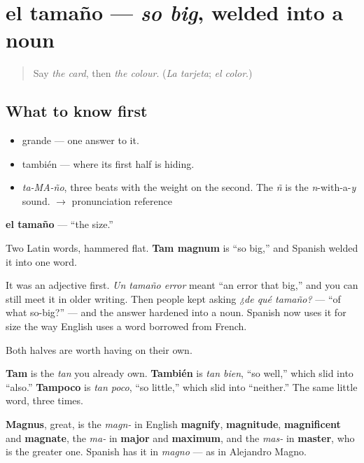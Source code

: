 \section[el tamaño]{el tamaño — \emph{so big}, welded into a noun}

\label{lesson:ES-C358-tamano}



\begin{quote}
Say \emph{the card}, then \emph{the colour}. (\emph{La tarjeta}; \emph{el color}.)
\end{quote}

\subsection*{What to know first}
\begin{itemize}
\raggedright
  \item grande — one answer to it.
  \item también — where its first half is hiding.
\end{itemize}

\begin{sounds}
\begin{itemize}
\raggedright
  \item \emph{ta-MA-ño}, three beats with the weight on the second. The \emph{ñ} is the \emph{n}-with-a-\emph{y} sound. $\to$ pronunciation reference
\end{itemize}
\end{sounds}

\begin{cousinweb}
\textbf{el tamaño} — \textquotedblleft{}the size.\textquotedblright{}

Two Latin words, hammered flat. \textbf{Tam magnum} is \textquotedblleft{}so big,\textquotedblright{} and Spanish welded it into one word.

It was an adjective first. \emph{Un tamaño error} meant \textquotedblleft{}an error that big,\textquotedblright{} and you can still meet it in older writing. Then people kept asking \emph{¿de qué tamaño?} — \textquotedblleft{}of what so-big?\textquotedblright{} — and the answer hardened into a noun. Spanish now uses it for size the way English uses a word borrowed from French.

Both halves are worth having on their own.

\textbf{Tam} is the \emph{tan} you already own. \textbf{También} is \emph{tan bien}, \textquotedblleft{}so well,\textquotedblright{} which slid into \textquotedblleft{}also.\textquotedblright{} \textbf{Tampoco} is \emph{tan poco}, \textquotedblleft{}so little,\textquotedblright{} which slid into \textquotedblleft{}neither.\textquotedblright{} The same little word, three times.

\textbf{Magnus}, great, is the \emph{magn-} in English \textbf{magnify}, \textbf{magnitude}, \textbf{magnificent} and \textbf{magnate}, the \emph{ma-} in \textbf{major} and \textbf{maximum}, and the \emph{mas-} in \textbf{master}, who is the greater one. Spanish has it in \emph{magno} — as in Alejandro Magno.
\end{cousinweb}

